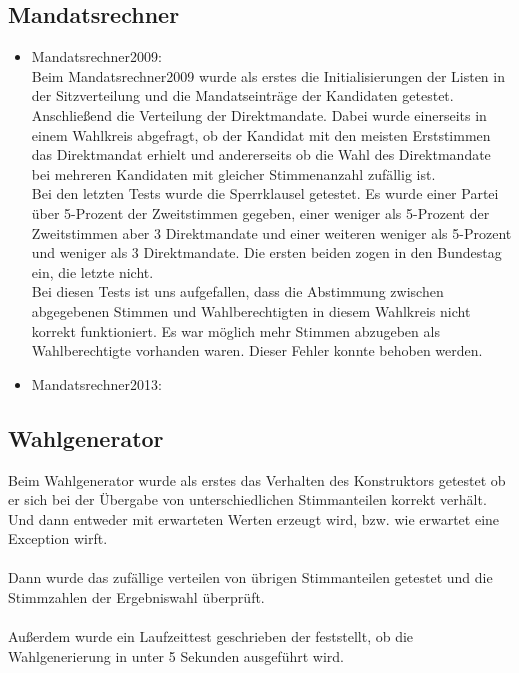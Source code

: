\documentclass[12pt,a4paper,titlepage]{article}
\begin{document}
\subsection{Mandatsrechner}
\begin{itemize}
\item Mandatsrechner2009:\\
Beim Mandatsrechner2009 wurde als erstes die Initialisierungen der Listen in der Sitzverteilung und die Mandatseinträge der Kandidaten getestet.\\
Anschließend die Verteilung der Direktmandate. Dabei wurde einerseits in einem Wahlkreis abgefragt, ob der Kandidat mit den meisten Erststimmen das Direktmandat erhielt und andererseits ob die Wahl des Direktmandate bei mehreren Kandidaten mit gleicher Stimmenanzahl zufällig ist.\\
Bei den letzten Tests wurde die Sperrklausel getestet. Es wurde einer Partei über 5-Prozent der Zweitstimmen gegeben, einer  weniger als 5-Prozent der Zweitstimmen aber 3 Direktmandate und einer weiteren weniger als 5-Prozent und weniger als 3 Direktmandate. Die ersten beiden zogen in den Bundestag ein, die letzte nicht. \\
Bei diesen Tests ist uns aufgefallen, dass die Abstimmung zwischen abgegebenen Stimmen und Wahlberechtigten in diesem Wahlkreis nicht korrekt funktioniert. Es war möglich mehr  Stimmen abzugeben als Wahlberechtigte vorhanden waren. Dieser Fehler konnte behoben werden.\\

\item Mandatsrechner2013:\\

\end{itemize}

\subsection{Wahlgenerator}
Beim Wahlgenerator wurde als erstes das Verhalten des Konstruktors getestet ob er sich bei der Übergabe von unterschiedlichen Stimmanteilen korrekt verhält. Und dann entweder mit erwarteten Werten erzeugt wird, bzw. wie erwartet eine Exception wirft.\\\\
Dann wurde das zufällige verteilen von übrigen Stimmanteilen getestet und die Stimmzahlen der Ergebniswahl überprüft.\\\\
Außerdem wurde ein Laufzeittest geschrieben der feststellt, ob die Wahlgenerierung in unter 5 Sekunden ausgeführt wird.
\end{document}
